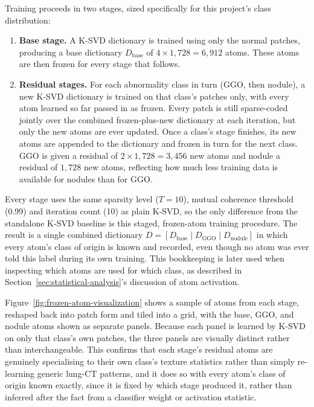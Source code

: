 Training proceeds in two stages, sized specifically for this project's
class distribution:

\begin{enumerate}
    \item \textbf{Base stage.} A K-SVD dictionary is trained using only
    the normal patches, producing a base dictionary $D_{\text{base}}$ of
    $4 \times 1{,}728 = 6{,}912$ atoms. These atoms are then frozen for
    every stage that follows.

    \item \textbf{Residual stages.} For each abnormality class in turn
    (GGO, then nodule), a new K-SVD dictionary is trained on that
    class's patches only, with every atom learned so far passed in as
    frozen. Every patch is still sparse-coded jointly over the combined
    frozen-plus-new dictionary at each iteration, but only the new atoms
    are ever updated. Once a class's stage finishes, its new atoms are
    appended to the dictionary and frozen in turn for the next class.
    GGO is given a residual of $2 \times 1{,}728 = 3{,}456$ new atoms
    and nodule a residual of $1{,}728$ new atoms, reflecting how much
    less training data is available for nodules than for GGO.
\end{enumerate}

Every stage uses the same sparsity level ($T=10$), mutual coherence
threshold (0.99) and iteration count (10) as plain K-SVD, so the only
difference from the standalone K-SVD baseline is this staged,
frozen-atom training procedure. The result is a single combined
dictionary $D = [D_{\text{base}} \mid D_{\text{GGO}} \mid D_{\text{nodule}}]$
in which every atom's class of origin is known and recorded, even
though no atom was ever told this label during its own training. This
bookkeeping is later used when inspecting which atoms are used for
which class, as described in Section~\ref{sec:statistical-analysis}'s
discussion of atom activation.

Figure~\ref{fig:frozen-atom-visualization} shows a sample of atoms from
each stage, reshaped back into patch form and tiled into a grid, with
the base, GGO, and nodule atoms shown as separate panels. Because each
panel is learned by K-SVD on only that class's own patches, the three
panels are visually distinct rather than interchangeable. 
This confirms that each stage's residual atoms
are genuinely specialising to their own class's texture statistics
rather than simply re-learning generic lung-CT patterns, and it does so
with every atom's class of origin known exactly, since it is fixed by
which stage produced it, rather than inferred after the fact from a
classifier weight or activation statistic.

